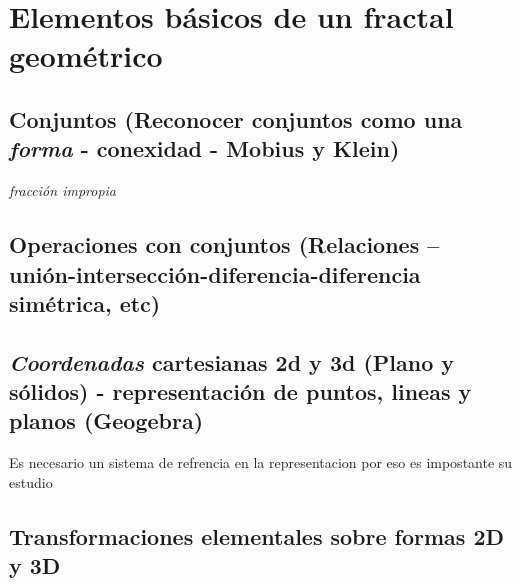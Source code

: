 \documentclass[
  11pt,
]{krantz}
\theoremstyle{definition}
\theoremstyle{definition}
\theoremstyle{definition}
\theoremstyle{definition}
\theoremstyle{remark}
\begin{document}
\hypertarget{elementos-buxe1sicos-de-un-fractal-geomuxe9trico}{%
\chapter{Elementos básicos de un fractal geométrico}\label{elementos-buxe1sicos-de-un-fractal-geomuxe9trico}}

\hypertarget{conjuntos-reconocer-conjuntos-como-una---conexidad---mobius-y-klein}{%
\section{\texorpdfstring{Conjuntos (Reconocer conjuntos como una \emph{forma} - conexidad - Mobius y Klein)}{Conjuntos (Reconocer conjuntos como una  - conexidad - Mobius y Klein)}}\label{conjuntos-reconocer-conjuntos-como-una---conexidad---mobius-y-klein}}

\citep{leithold1990calculus}

\emph{fracción impropia} 

\hypertarget{operaciones-con-conjuntos-relaciones-uniuxf3n-intersecciuxf3n-diferencia-diferencia-simuxe9trica-etc}{%
\section{Operaciones con conjuntos (Relaciones -- unión-intersección-diferencia-diferencia simétrica, etc)}\label{operaciones-con-conjuntos-relaciones-uniuxf3n-intersecciuxf3n-diferencia-diferencia-simuxe9trica-etc}}

\citep{stigt1996}
\citep{langlois2021}

\hypertarget{cartesianas-2d-y-3d-plano-y-suxf3lidos---representaciuxf3n-de-puntos-lineas-y-planos-geogebra}{%
\section{\texorpdfstring{\emph{Coordenadas} cartesianas 2d y 3d (Plano y sólidos) - representación de puntos, lineas y planos (Geogebra)}{ cartesianas 2d y 3d (Plano y sólidos) - representación de puntos, lineas y planos (Geogebra)}}\label{cartesianas-2d-y-3d-plano-y-suxf3lidos---representaciuxf3n-de-puntos-lineas-y-planos-geogebra}}

Es necesario un sistema de refrencia en la representacion por eso es impostante su estudio

\hypertarget{transformaciones-elementales-sobre-formas-2d-y-3d}{%
\section{Transformaciones elementales sobre formas 2D y 3D}\label{transformaciones-elementales-sobre-formas-2d-y-3d}}
\end{document}
